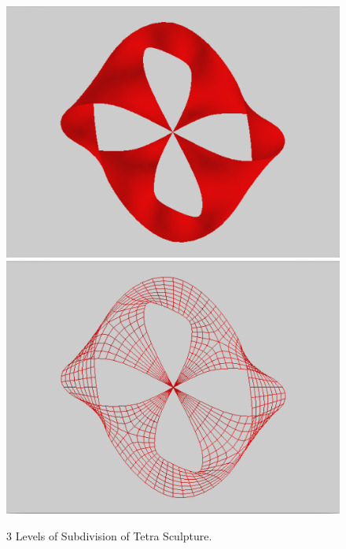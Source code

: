 \documentclass[12pt]{article}
\begin{document}
\begin{figure}[h!]
  \centering
    \includegraphics[width=\textwidth]{Tetra3}
    \includegraphics[width=\textwidth]{Tetra3w}
  \caption{3 Levels of Subdivision of Tetra Sculpture.} \label{figure:Tetra3}
\end{figure}
\end{document}
